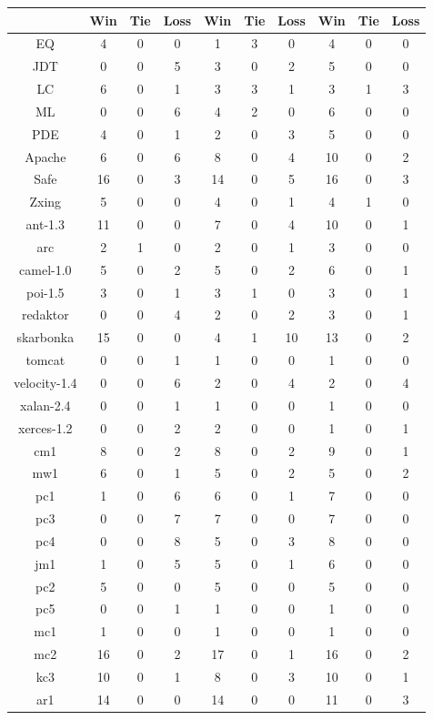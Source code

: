 \begin{table}[!t]
\begin{tabular}{|@{}c@{}||@{}c@{}|@{}c@{}|@{}c@{}||@{}c@{}|@{}c@{}|@{}c@{}||@{}c@{}|@{}c@{}|@{}c@{}|}
& Win & Tie & Loss & Win & Tie & Loss & Win & Tie & Loss \\ \hline \hline
EQ	&4	&0 	&0	&1	&3 	&0	&4	&0 	&0\\ \hline
JDT	&0	&0 	&5	&3	&0 	&2	&5	&0 	&0\\ \hline
LC	&6	&0 	&1	&3	&3 	&1	&3	&1 	&3\\ \hline
ML	&0	&0 	&6	&4	&2 	&0	&6	&0 	&0\\ \hline
PDE	&4	&0 	&1	&2	&0 	&3	&5	&0 	&0\\ \hline
Apache	&6	&0 	&6	&8	&0 	&4	&10	&0 	&2\\ \hline
Safe	&16	&0 	&3	&14	&0 	&5	&16	&0 	&3\\ \hline
Zxing	&5	&0 	&0	&4	&0 	&1	&4	&1 	&0\\ \hline
ant-1.3	&11	&0 	&0	&7	&0 	&4	&10	&0 	&1\\ \hline
arc	&2	&1 	&0	&2	&0 	&1	&3	&0 	&0\\ \hline
camel-1.0	&5	&0 	&2	&5	&0 	&2	&6	&0 	&1\\ \hline
poi-1.5	&3	&0 	&1	&3	&1 	&0	&3	&0 	&1\\ \hline
redaktor	&0	&0 	&4	&2	&0 	&2	&3	&0 	&1\\ \hline
skarbonka	&15	&0 	&0	&4	&1 	&10	&13	&0 	&2\\ \hline
tomcat	&0	&0 	&1	&1	&0 	&0	&1	&0 	&0\\ \hline
velocity-1.4	&0	&0 	&6	&2	&0 	&4	&2	&0 	&4\\ \hline
xalan-2.4	&0	&0 	&1	&1	&0 	&0	&1	&0 	&0\\ \hline
xerces-1.2	&0	&0 	&2	&2	&0 	&0	&1	&0 	&1\\ \hline
cm1	&8	&0 	&2	&8	&0 	&2	&9	&0 	&1\\ \hline
mw1	&6	&0 	&1	&5	&0 	&2	&5	&0 	&2\\ \hline
pc1	&1	&0 	&6	&6	&0 	&1	&7	&0 	&0\\ \hline
pc3	&0	&0 	&7	&7	&0 	&0	&7	&0 	&0\\ \hline
pc4	&0	&0 	&8	&5	&0 	&3	&8	&0 	&0\\ \hline
jm1	&1	&0 	&5	&5	&0 	&1	&6	&0 	&0\\ \hline
pc2	&5	&0 	&0	&5	&0 	&0	&5	&0 	&0\\ \hline
pc5	&0	&0 	&1	&1	&0 	&0	&1	&0 	&0\\ \hline
mc1	&1	&0 	&0	&1	&0 	&0	&1	&0 	&0\\ \hline
mc2	&16	&0 	&2	&17	&0 	&1	&16	&0 	&2\\ \hline
kc3	&10	&0 	&1	&8	&0 	&3	&10	&0 	&1\\ \hline
ar1	&14	&0 	&0	&14	&0 	&0	&11	&0 	&3\\ \hline

\end{tabular}
\end{table}
